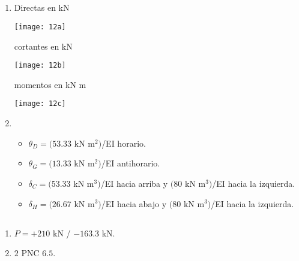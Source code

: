 \subsection{}

\begin{enumerate}[label=\alph*)]
	\item Directas en kN


\begin{center}
	\texttt{[image: 12a]}
\end{center}

cortantes en kN

\begin{center}
	\texttt{[image: 12b]}
\end{center}

momentos en kN m

\begin{center}
	\texttt{[image: 12c]}
\end{center}
\addtocounter{enumi}{1}

\item 
\begin{itemize}
\item $\theta_D = (53.33$ kN m$^2)$/EI horario.
\item $ \theta_G = (13.33$ kN m$^2)$/EI antihorario.
\item $ \delta_C = (53.33 $ kN m$^3)$/EI hacia arriba y $(80$ kN m$^3)$/EI hacia la izquierda.
\item  $\delta_H = (26.67$ kN m$^3)$/EI hacia abajo y $(80$ kN m$^3)$/EI hacia la izquierda.
\end{itemize} 
\end{enumerate}





\subsection{}

\begin{enumerate}[label=\alph*)]
	
\item $P = +210$ kN / $- 163.3$ kN.

\item $2$ PNC $6.5$.

\end{enumerate}


